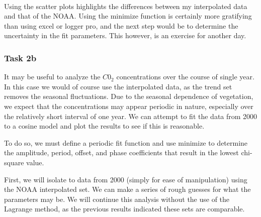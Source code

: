 \documentclass[11pt]{article}
\begin{document}
    \begin{center}
    \end{center}
    { \hspace*{\fill} \\}
    
    Using the scatter plots highlights the differences between my
interpolated data and that of the NOAA. Using the minimize function is
certainly more gratifying than using excel or logger pro, and the next
step would be to determine the uncertainty in the fit parameters. This
however, is an exercise for another day.

\subsubsection{Task 2b}\label{task-2b}

It may be useful to analyze the \(C0_2\) concentrations over the course
of single year. In this case we would of course use the interpolated
data, as the trend set removes the seasonal fluctuations. Due to the
seasonal dependence of vegetation, we expect that the concentrations may
appear periodic in nature, especially over the relatively short interval
of one year. We can attempt to fit the data from 2000 to a cosine model
and plot the results to see if this is reasonable.

To do so, we must define a periodic fit function and use minimize to
determine the amplitude, period, offset, and phase coefficients that
result in the lowest chi-square value.

First, we will isolate to data from 2000 (simply for ease of
manipulation) using the NOAA interpolated set. We can make a series of
rough guesses for what the parameters may be. We will continue this
analysis without the use of the Lagrange method, as the previous results
indicated these sets are comparable.
\end{document}
